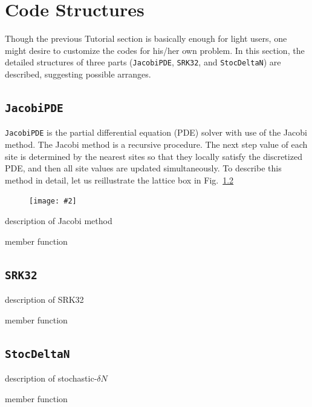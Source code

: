 \documentclass[aps, prd
, preprint
, nofootinbib 
, notitlepage
, superscriptaddress
, longbibliography
]{revtex4-1}
\newcommand{\bfe}[4]{
\begin{figure} 
	\centering
	\texttt{[image: \#2]}
	\caption{#3}
	\label{#4}
\end{figure}}
\begin{document}
\section{Code Structures}

Though the previous Tutorial section is basically enough for light users, one might desire to customize the codes for his/her own problem.
In this section, the detailed structures of three parts (\texttt{JacobiPDE}, \texttt{SRK32}, and \texttt{StocDeltaN}) are described, suggesting possible arranges.


\subsection{\texttt{JacobiPDE}}

\texttt{JacobiPDE} is the partial differential equation (PDE) solver with use of the Jacobi method.
The Jacobi method is a recursive procedure.
The next step value of each site is determined by the nearest sites so that they locally satisfy the discretized PDE, and then all site values are updated simultaneously. To describe this method in detail, let us reillustrate the lattice box in Fig.~\ref{}

\bfe{width=0.9\hsize}{figs/lattice.pdf}{}{fig: lattice}


description of Jacobi method

member function



\subsection{\texttt{SRK32}}

description of SRK32

member function


\subsection{\texttt{StocDeltaN}}\label{sec: StocDeltaN}

description of stochastic-$\delta N$

member function
















\end{document}
